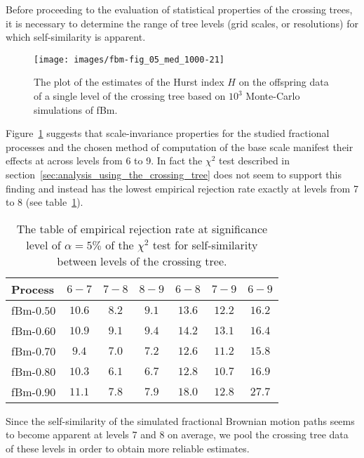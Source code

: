Before proceeding to the evaluation of statistical properties of the crossing trees,
it is necessary to determine the range of tree levels (grid scales, or resolutions)
for which self-similarity is apparent.
\begin{figure}[htb]\begin{center}
    \texttt{[image: images/fbm-fig\_05\_med\_1000-21]}
    \caption{The plot of the estimates of the Hurst index $H$ on the offspring data
    of a single level of the crossing tree based on $10^3$ Monte-Carlo simulations of
    fBm.}
\label{fig:fbm_hurst_crossing_tree}
\end{center}\end{figure}

Figure~\ref{fig:fbm_hurst_crossing_tree} suggests that scale-invariance properties
for the studied fractional processes and the chosen method of computation of the
base scale manifest their effects at across levels from 6 to 9. In fact the $\chi^2$
test described in section~\ref{sec:analysis_using_the_crossing_tree} does not seem
to support this finding and instead has the lowest empirical rejection rate exactly
at levels from 7 to 8 (see table~\ref{tbl:chi_sq_test_for_fbm_only}).
\begin{table}[h]\begin{center}
	\begin{tabular}{l||c|c|c|c|c|c|}
	Process 		&  $6-7$ &          $7-8$ & $8-9$ &  $6-8$ &  $7-9$ &  $6-9$ \\ \hline\hline
	fBm-$0.50$ 		& $10.6$ & $\mathbf{8.2}$ & $9.1$ & $13.6$ & $12.2$ & $16.2$ \\ \hline 
	fBm-$0.60$ 		& $10.9$ & $\mathbf{9.1}$ & $9.4$ & $14.2$ & $13.1$ & $16.4$ \\ \hline 
	fBm-$0.70$ 		&  $9.4$ & $\mathbf{7.0}$ & $7.2$ & $12.6$ & $11.2$ & $15.8$ \\ \hline 
	fBm-$0.80$ 		& $10.3$ & $\mathbf{6.1}$ & $6.7$ & $12.8$ & $10.7$ & $16.9$ \\ \hline 
	fBm-$0.90$ 		& $11.1$ & $\mathbf{7.8}$ & $7.9$ & $18.0$ & $12.8$ & $27.7$ \\ \hline 
 	\end{tabular}
	\caption{The table of empirical rejection rate at significance level of $\alpha = 5\%$
	of the $\chi^2$ test for self-similarity between levels of the crossing tree. }
\label{tbl:chi_sq_test_for_fbm_only}
\end{center}\end{table}
Since the self-similarity of the simulated fractional Brownian motion paths seems
to become apparent at levels 7 and 8 on average, we pool the crossing tree data of
these levels in order to obtain more reliable estimates.

